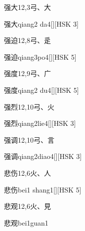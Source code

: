 \begin{entry}{强大}{12,3}{⼸、⼤}
  \begin{phonetics}{强大}{qiang2 da4}[][HSK 3]
  \end{phonetics}
\end{entry}

\begin{entry}{强迫}{12,8}{⼸、⾡}
  \begin{phonetics}{强迫}{qiang3po4}[][HSK 5]
  \end{phonetics}
\end{entry}

\begin{entry}{强度}{12,9}{⼸、⼴}
  \begin{phonetics}{强度}{qiang2 du4}[][HSK 5]
  \end{phonetics}
\end{entry}

\begin{entry}{强烈}{12,10}{⼸、⽕}
  \begin{phonetics}{强烈}{qiang2lie4}[][HSK 3]
  \end{phonetics}
\end{entry}

\begin{entry}{强调}{12,10}{⼸、⾔}
  \begin{phonetics}{强调}{qiang2diao4}[][HSK 3]
  \end{phonetics}
\end{entry}

\begin{entry}{悲伤}{12,6}{⽕、⼈}
  \begin{phonetics}{悲伤}{bei1 shang1}[][HSK 5]
  \end{phonetics}
\end{entry}

\begin{entry}{悲观}{12,6}{⽕、⾒}
  \begin{phonetics}{悲观}{bei1guan1}
  \end{phonetics}
\end{entry}

